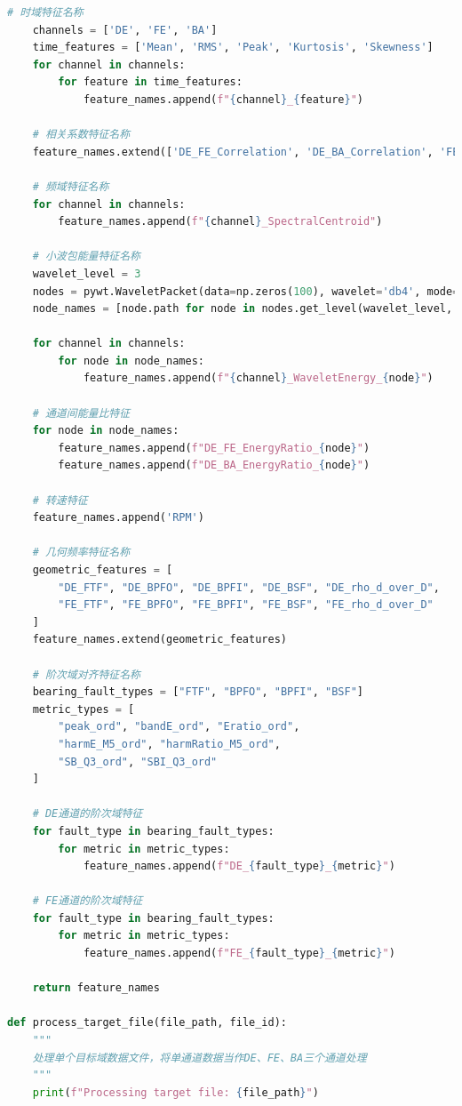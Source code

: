 \documentclass[a4paper]{CPIPC}
\numberwithin{equation}{section}
\begin{document}
\begin{lstlisting}[language=Python, caption=Target Domain Feature Extraction]
    # 时域特征名称
    channels = ['DE', 'FE', 'BA']
    time_features = ['Mean', 'RMS', 'Peak', 'Kurtosis', 'Skewness']
    for channel in channels:
        for feature in time_features:
            feature_names.append(f"{channel}_{feature}")
    
    # 相关系数特征名称
    feature_names.extend(['DE_FE_Correlation', 'DE_BA_Correlation', 'FE_BA_Correlation'])
    
    # 频域特征名称
    for channel in channels:
        feature_names.append(f"{channel}_SpectralCentroid")
    
    # 小波包能量特征名称
    wavelet_level = 3
    nodes = pywt.WaveletPacket(data=np.zeros(100), wavelet='db4', mode='symmetric', maxlevel=wavelet_level)
    node_names = [node.path for node in nodes.get_level(wavelet_level, 'natural')]
    
    for channel in channels:
        for node in node_names:
            feature_names.append(f"{channel}_WaveletEnergy_{node}")
    
    # 通道间能量比特征
    for node in node_names:
        feature_names.append(f"DE_FE_EnergyRatio_{node}")
        feature_names.append(f"DE_BA_EnergyRatio_{node}")
    
    # 转速特征
    feature_names.append('RPM')
    
    # 几何频率特征名称
    geometric_features = [
        "DE_FTF", "DE_BPFO", "DE_BPFI", "DE_BSF", "DE_rho_d_over_D",
        "FE_FTF", "FE_BPFO", "FE_BPFI", "FE_BSF", "FE_rho_d_over_D"
    ]
    feature_names.extend(geometric_features)
    
    # 阶次域对齐特征名称
    bearing_fault_types = ["FTF", "BPFO", "BPFI", "BSF"]
    metric_types = [
        "peak_ord", "bandE_ord", "Eratio_ord", 
        "harmE_M5_ord", "harmRatio_M5_ord", 
        "SB_Q3_ord", "SBI_Q3_ord"
    ]
    
    # DE通道的阶次域特征
    for fault_type in bearing_fault_types:
        for metric in metric_types:
            feature_names.append(f"DE_{fault_type}_{metric}")
    
    # FE通道的阶次域特征
    for fault_type in bearing_fault_types:
        for metric in metric_types:
            feature_names.append(f"FE_{fault_type}_{metric}")

    return feature_names

def process_target_file(file_path, file_id):
    """
    处理单个目标域数据文件，将单通道数据当作DE、FE、BA三个通道处理
    """
    print(f"Processing target file: {file_path}")
    

\end{lstlisting}
\end{document}
